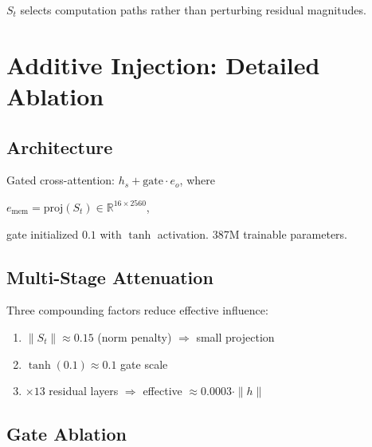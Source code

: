 \documentclass[11pt,a4paper]{article}
\newcommand{\R}{\mathbb{R}}
\newcommand{\St}{S_t}
\begin{document}
$\St$ selects computation paths rather than perturbing residual magnitudes.




\appendix




\section{Additive Injection: Detailed Ablation}

\label{app:additive}



\subsection*{Architecture}



Gated cross-attention: $h_s + \mathrm{gate} \cdot e_o$, where

$e_{\mathrm{mem}} = \mathrm{proj}(\St) \in \R^{16 \times 2560}$,

gate initialized $0.1$ with $\tanh$ activation. 387M trainable parameters.



\subsection*{Multi-Stage Attenuation}



Three compounding factors reduce effective influence:

\begin{enumerate}

  \item $\|S_t\| \approx 0.15$ (norm penalty) $\Rightarrow$ small projection

  \item $\tanh(0.1) \approx 0.1$ gate scale

  \item $\times 13$ residual layers $\Rightarrow$ effective $\approx 0.0003 \cdot \|h\|$

\end{enumerate}



\subsection*{Gate Ablation}
\end{document}
